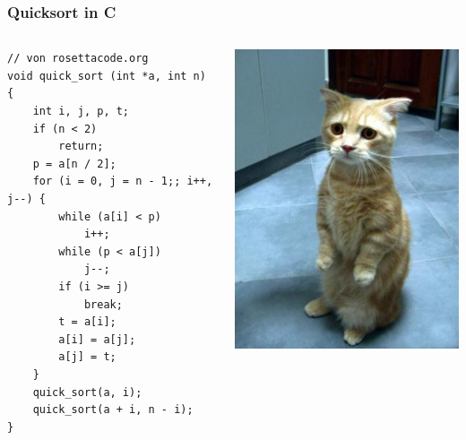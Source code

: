\documentclass[12pt,compress,ngerman,utf8,t]{beamer}
\begin{document}
\begin{frame}[fragile]\frametitle{Quicksort in C}
  \begin{columns}
    \begin{column}[b]{0.6\textwidth}
      \scriptsize
      \begin{verbatim}
// von rosettacode.org
void quick_sort (int *a, int n) {
    int i, j, p, t;
    if (n < 2)
        return;
    p = a[n / 2];
    for (i = 0, j = n - 1;; i++, j--) {
        while (a[i] < p)
            i++;
        while (p < a[j])
            j--;
        if (i >= j)
            break;
        t = a[i];
        a[i] = a[j];
        a[j] = t;
    }
    quick_sort(a, i);
    quick_sort(a + i, n - i);
}
      \end{verbatim}
    \end{column}

    \begin{column}{0.2\textwidth}
      \includegraphics[scale=0.3,flip]{images/sad-cat.jpg}
    \end{column}
  \end{columns}
\end{frame}
\end{document}
